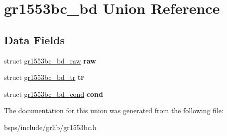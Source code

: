 \hypertarget{uniongr1553bc__bd}{}\section{gr1553bc\+\_\+bd Union Reference}
\label{uniongr1553bc__bd}
\subsection*{Data Fields}
\begin{DoxyCompactItemize}
\item 
\mbox{\label{uniongr1553bc__bd_a0d85f3bb7feb568c1e21560d01304003}} 
struct \mbox{\hyperlink{structgr1553bc__bd__raw}{gr1553bc\+\_\+bd\+\_\+raw}} {\bfseries raw}
\item 
\mbox{\label{uniongr1553bc__bd_a9d2474c8e75a153862690ab38daaf996}} 
struct \mbox{\hyperlink{structgr1553bc__bd__tr}{gr1553bc\+\_\+bd\+\_\+tr}} {\bfseries tr}
\item 
\mbox{\label{uniongr1553bc__bd_a941e63d543acd0c4724d66f3c6b1ffc8}} 
struct \mbox{\hyperlink{structgr1553bc__bd__cond}{gr1553bc\+\_\+bd\+\_\+cond}} {\bfseries cond}
\end{DoxyCompactItemize}


The documentation for this union was generated from the following file\+:\begin{DoxyCompactItemize}
\item 
bsps/include/grlib/gr1553bc.\+h\end{DoxyCompactItemize}
